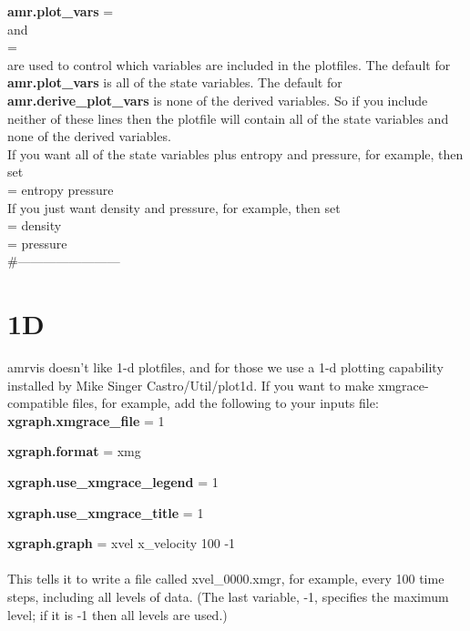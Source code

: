{\bf amr.plot\_vars} = \\

\noindent and  \\

 = \\

\noindent are used to control which variables are included in the plotfiles.  The default for {\bf amr.plot\_vars}
is all of the state variables.  The default for {\bf amr.derive\_plot\_vars} is none of
the derived variables.  So if you include neither of these lines then the plotfile
will contain all of the state variables and none of the derived variables. \\

\noindent If you want all of the state variables plus entropy and pressure, for example, then set \\

 = entropy pressure \\

\noindent If you just want density and pressure, for example, then set \\

 =  density \\

 = pressure \\


\#------------------------

\section{1D}

amrvis doesn't like 1-d plotfiles, and for those we use a 1-d plotting
capability installed by Mike Singer Castro/Util/plot1d.  If you want
to make xmgrace-compatible files, for example, add the following to
your inputs file:\\

{\bf xgraph.xmgrace\_file} = 1

{\bf xgraph.format} = xmg

{\bf xgraph.use\_xmgrace\_legend} = 1

{\bf xgraph.use\_xmgrace\_title} = 1

{\bf xgraph.graph} = xvel x\_velocity 100 -1\\ \\
This tells it to write a file called xvel\_0000.xmgr, for example, every 100 time steps, including all levels of data. (The last variable, -1, specifies the maximum level; if it is -1 then all levels are used.)

